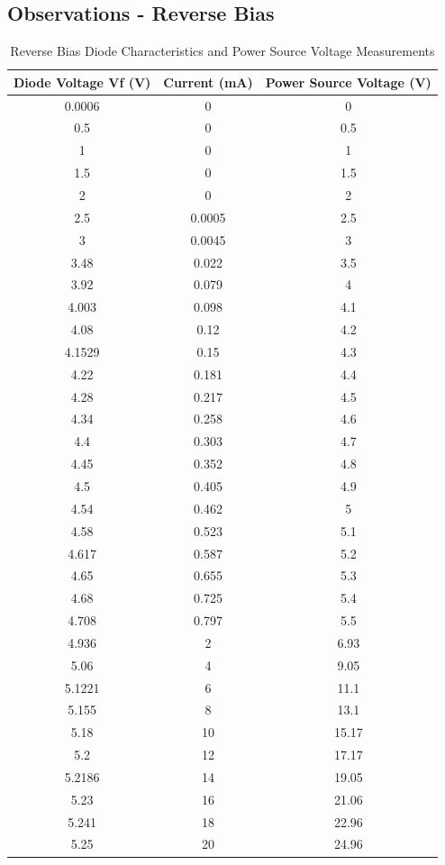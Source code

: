 \documentclass[12pt,a4paper]{article}
\begin{document}
\subsection{Observations - Reverse Bias }
\begin{table}[H]
    \centering
    \caption{Reverse Bias Diode Characteristics and Power Source Voltage Measurements}
    \label{tab:zener_reverse_data_basic}
    \begin{tabular}{|c|c|c|}
        \hline
        \textbf{Diode Voltage Vf (V)} & \textbf{Current (mA)} & \textbf{Power Source Voltage (V)} \\
        \hline
        0.0006  & 0      & 0     \\
        0.5     & 0      & 0.5   \\
        1       & 0      & 1     \\
        1.5     & 0      & 1.5   \\
        2       & 0      & 2     \\
        2.5     & 0.0005 & 2.5   \\
        3       & 0.0045 & 3     \\
        3.48    & 0.022  & 3.5   \\
        3.92    & 0.079  & 4     \\
        4.003   & 0.098  & 4.1   \\
        4.08    & 0.12   & 4.2   \\
        4.1529  & 0.15   & 4.3   \\
        4.22    & 0.181  & 4.4   \\
        4.28    & 0.217  & 4.5   \\
        4.34    & 0.258  & 4.6   \\
        4.4     & 0.303  & 4.7   \\
        4.45    & 0.352  & 4.8   \\
        4.5     & 0.405  & 4.9   \\
        4.54    & 0.462  & 5     \\
        4.58    & 0.523  & 5.1   \\
        4.617   & 0.587  & 5.2   \\
        4.65    & 0.655  & 5.3   \\
        4.68    & 0.725  & 5.4   \\
        4.708   & 0.797  & 5.5   \\
        4.936   & 2      & 6.93  \\
        5.06    & 4      & 9.05  \\
        5.1221  & 6      & 11.1  \\
        5.155   & 8      & 13.1  \\
        5.18    & 10     & 15.17 \\
        5.2     & 12     & 17.17 \\
        5.2186  & 14     & 19.05 \\
        5.23    & 16     & 21.06 \\
        5.241   & 18     & 22.96 \\
        5.25    & 20     & 24.96 \\
        \hline
    \end{tabular}
\end{table}
\end{document}

